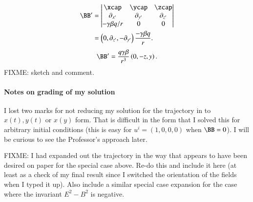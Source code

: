 {%
\begin{equation}\label{eqn:relElectroDynProblemSet2:1270}
\begin{aligned}
\BB'
&=
\begin{vmatrix}
\xcap & \ycap & \zcap \\
\partial_{x'} & \partial_{y'} & \partial_{z'} \\
-\gamma \beta q/r & 0 & 0
\end{vmatrix} \\
&=
\left( 0, \partial_{z'}, -\partial_{y'} \right) \frac{-\gamma \beta q}{r}.
\end{aligned}
\end{equation}
%
\begin{equation}\label{eqn:relElectroDynProblemSet2:1090}
\BB'
=
\frac{q \gamma \beta}{r^3} \left( 0, -z, y \right).
\end{equation}
%
FIXME: sketch and comment.
%
\paragraph{Notes on grading of my solution}
%
I lost two marks for not reducing my solution for the trajectory in  to \(x(t), y(t)\) or \(x(y)\) form.  That is difficult in the form that I solved this for arbitrary initial conditions (this is easy for \(u^i = (1, 0, 0, 0)\) when \(\BB = 0\)).  I will be curious to see the Professor's approach later.

FIXME: I had expanded out the trajectory in the way that appears to have been desired on paper for the special case above.  Re-do this and include it here (at least as a check of my final result since I switched the orientation of the fields when I typed it up).  Also include a similar special case expansion for the case where the invariant \(E^2 - B^2\) is negative.

}




